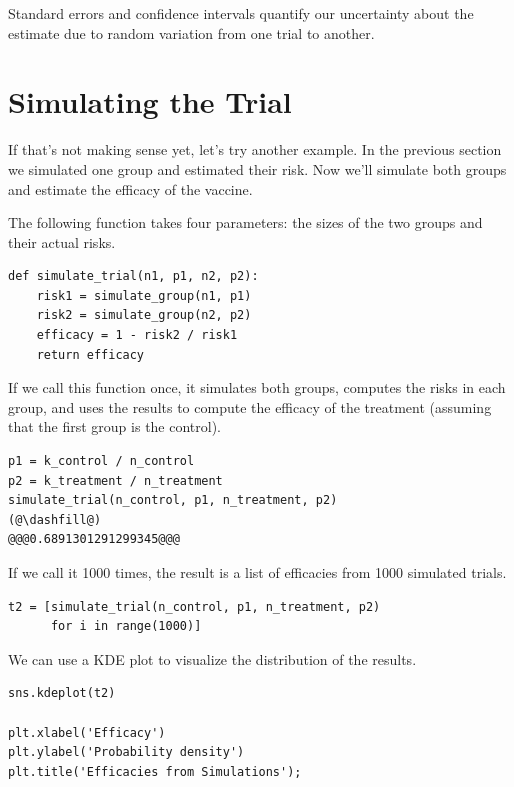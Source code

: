 Standard errors and confidence intervals quantify our uncertainty about
the estimate due to random variation from one trial to another.

\hypertarget{simulating-the-trial}{%
\section{Simulating the Trial}\label{simulating-the-trial}}

If that's not making sense yet, let's try another example. In the
previous section we simulated one group and estimated their risk. Now
we'll simulate both groups and estimate the efficacy of the vaccine.

The following function takes four parameters: the sizes of the two
groups and their actual risks.

\begin{lstlisting}[]
def simulate_trial(n1, p1, n2, p2):
    risk1 = simulate_group(n1, p1)
    risk2 = simulate_group(n2, p2)
    efficacy = 1 - risk2 / risk1
    return efficacy
\end{lstlisting}

If we call this function once, it simulates both groups, computes the
risks in each group, and uses the results to compute the efficacy of the
treatment (assuming that the first group is the control).

\begin{lstlisting}[]
p1 = k_control / n_control
p2 = k_treatment / n_treatment
simulate_trial(n_control, p1, n_treatment, p2)
(@\dashfill@)
@@@0.6891301291299345@@@
\end{lstlisting}

If we call it 1000 times, the result is a list of efficacies from 1000
simulated trials.

\begin{lstlisting}[]
t2 = [simulate_trial(n_control, p1, n_treatment, p2)
      for i in range(1000)]
\end{lstlisting}

We can use a KDE plot to visualize the distribution of the results.

\begin{lstlisting}[]
sns.kdeplot(t2)

plt.xlabel('Efficacy')
plt.ylabel('Probability density')
plt.title('Efficacies from Simulations');
\end{lstlisting}

